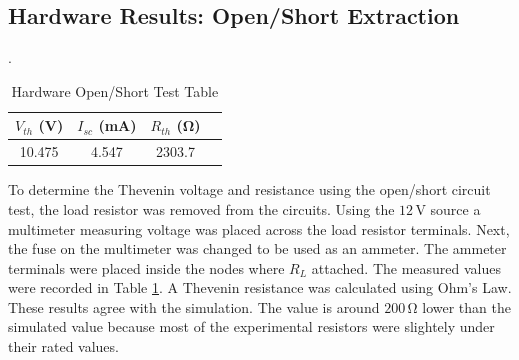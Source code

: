\documentclass[11pt]{article}
\begin{document}
\subsection{Hardware Results: Open/Short Extraction}
  \begin{table}[h!]
  	\centering
  	\caption{Hardware Open/Short Test Table}.
  	\label{Table:Lab3VocIsc}
  	\begin{tabular}{|c|c|c|c|}
  		\hline
  		$V_{th}$ (\si{\volt})& $I_{sc}$ (\si{\milli\ampere}) & $R_{th}$ (\si{\ohm}) \\
  		\hline
  		10.475 & 4.547 & 2303.7 \\	 \hline 
  	\end{tabular}
  \end{table}

To determine the Thevenin voltage and resistance using the open/short circuit test, the load resistor was removed from the circuits. Using the $12\,\si\volt$ source a multimeter measuring voltage was placed across the load resistor terminals. Next, the fuse on the multimeter was changed to be used as an ammeter. The ammeter terminals were placed inside the nodes where $R_L$ attached. The measured values were recorded in Table \ref{Table:Lab3VocIsc}. A Thevenin resistance was calculated using Ohm's Law. These results agree with the simulation. The value is around $200\,\si\ohm$ lower than the simulated value because most of the experimental resistors were slightely under their rated values.
\end{document}
